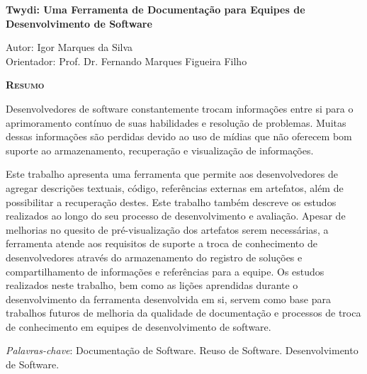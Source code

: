 \begin{center}
	{\Large{\textbf{Twydi: Uma Ferramenta de Documentação para Equipes de Desenvolvimento de Software}}}
\end{center}

\vspace{1cm}

\begin{flushright}
	Autor: Igor Marques da Silva\\
	Orientador: Prof. Dr. Fernando Marques Figueira Filho
\end{flushright}

\vspace{1cm}

\begin{center}
	\Large{\textsc{\textbf{Resumo}}}
\end{center}

\noindent
Desenvolvedores de software constantemente trocam informações entre si para o aprimoramento contínuo de suas habilidades e resolução de problemas. Muitas dessas informações são perdidas devido ao uso de mídias que não oferecem bom suporte ao armazenamento, recuperação e visualização de informações.

Este trabalho apresenta uma ferramenta que permite aos desenvolvedores de agregar descrições textuais, código, referências externas em artefatos, além de possibilitar a recuperação destes. Este trabalho também descreve os estudos realizados ao longo do seu processo de desenvolvimento e avaliação. Apesar de melhorias no quesito de pré-visualização dos artefatos serem necessárias, a ferramenta atende aos requisitos de suporte a troca de conhecimento de desenvolvedores através do armazenamento do registro de soluções e compartilhamento de informações e referências para a equipe. Os estudos realizados neste trabalho, bem como as lições aprendidas durante o desenvolvimento da ferramenta desenvolvida em si, servem como base para trabalhos futuros de melhoria da qualidade de documentação e processos de troca de conhecimento em equipes de desenvolvimento de software.

\noindent\textit{Palavras-chave}: Documentação de Software. Reuso de Software. Desenvolvimento de Software.
